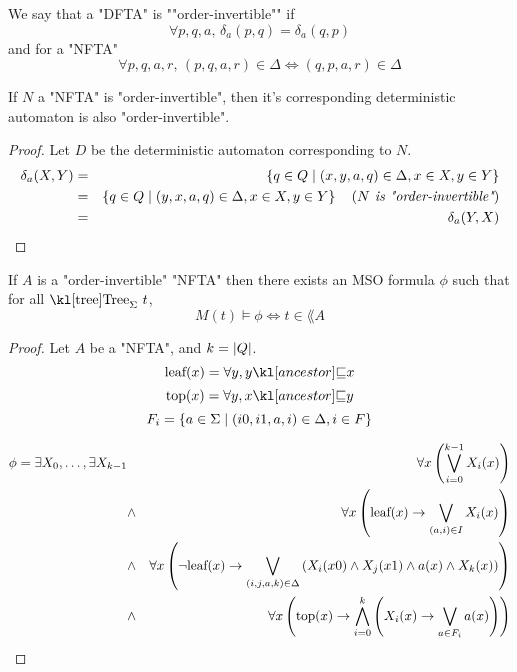 \documentclass{article}
\begin{document}
\begin{definition}
	We say that a "DFTA" is ""order-invertible"" if
	$$ \forall p,q,a,\, \delta_a (p,q) = \delta_a (q,p) $$
	and for a "NFTA"
	$$ \forall p,q,a,r,\, (p,q,a,r) \in \Delta \iff  (q,p,a,r) \in \Delta $$

\end{definition}


\begin{lemma}
	If $N$ a "NFTA" is "order-invertible", then it's corresponding deterministic automaton is also "order-invertible".
\end{lemma}

\begin{proof}
	Let $D$ be the deterministic automaton corresponding to $N$.
	\begin{eqnarray*}
		\delta_a (X,Y) &=& \left\{q \in Q \mid (x,y,a,q) \in \Delta, x \in X, y \in Y\right\} \\
		&=& \left\{q \in Q \mid (y,x,a,q) \in \Delta, x \in X, y \in Y\right\}  \quad\left(\textit{$N$ is "order-invertible"}\right) \\
		&=& \delta_a (Y,X)
	\end{eqnarray*}
\end{proof}

\begin{theorem}
	If $A$ is a "order-invertible" "NFTA"  then there exists an MSO formula $\phi$ such that for all $\tree_{\Sigma} \ t$,
	$$ M(t) \models \phi \iff t \in \lang A$$
\end{theorem}

\begin{proof}
	Let $A$ be a "NFTA", and $k = \left|Q\right|$.
	$$\text{leaf} (x) = \forall y, \ancestor y x$$
	$$\text{top} (x) = \forall y, \ancestor x y$$
	$$F_i = \left\{a \in \Sigma \mid (i0,i1,a,i) \in \Delta, i \in F\right\}$$


	\begin{eqnarray*}
		\phi = \exists X_0,\ldots, \exists X_{k-1} &\ & \forall x \left( \bigvee_{i=0}^{k-1} X_i(x) \right) \\
		&\land& \forall x \left( \text{leaf} (x) \rightarrow \bigvee_{(a,i)\in I}  X_i(x)   \right) \\
		&\land& \forall x \left(\lnot \text{leaf}(x) \rightarrow \bigvee_{(i,j,a,k)\in \Delta}  \left(X_i(x0) \land X_j(x1) \land a(x) \land X_k(x)\right)\right) \\
		&\land& \forall x \left(\text{top}(x) \rightarrow \bigwedge_{i= 0}^k \left( X_i(x) \rightarrow \bigvee_{a \in F_i} a(x) \right)\right)
	\end{eqnarray*}


\end{proof}





\end{document}

